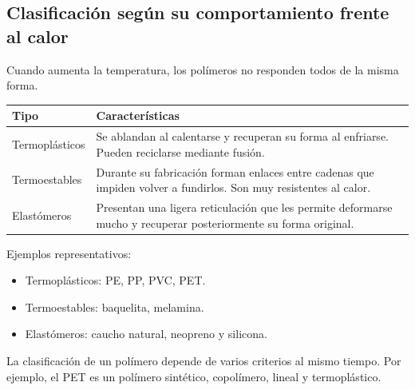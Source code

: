 
\subsection{Clasificación según su comportamiento frente al calor}

Cuando aumenta la temperatura, los polímeros no responden todos de la misma forma.

\begin{center}
\begin{tabular}{p{3.5cm}p{7.5cm}}
\toprule
\textbf{Tipo} & \textbf{Características} \\
\midrule

Termoplásticos &
Se ablandan al calentarse y recuperan su forma al enfriarse. Pueden reciclarse mediante fusión.\\

\addlinespace

Termoestables &
Durante su fabricación forman enlaces entre cadenas que impiden volver a fundirlos. Son muy resistentes al calor.\\

\addlinespace

Elastómeros &
Presentan una ligera reticulación que les permite deformarse mucho y recuperar posteriormente su forma original.\\

\bottomrule
\end{tabular}
\end{center}

\vspace{0.3cm}

Ejemplos representativos:

\begin{itemize}

\item Termoplásticos: PE, PP, PVC, PET.

\item Termoestables: baquelita, melamina.

\item Elastómeros: caucho natural, neopreno y silicona.

\end{itemize}


\begin{tcolorbox}[
title=Recuerda,
colback=blue!5,
colframe=blue!70!black]

La clasificación de un polímero depende de varios criterios al mismo tiempo. Por ejemplo, el PET es un polímero sintético, copolímero, lineal y termoplástico.

\end{tcolorbox}

